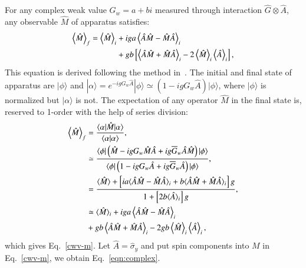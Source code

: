 \documentclass[twocolumn,pra,aps,superscriptaddress]{revtex4-2}
\begin{document}
For any complex weak value $G_{w}=a+bi$ measured through interaction $\hat{G}\otimes \hat{A}$, any observable $\hat{M}$ of apparatus satisfies:
\begin{align}
\label{cwv-m}
\left\langle \hat{M}\right\rangle _{f}=\left\langle \hat{M}\right\rangle _{i} &+iga\left\langle \hat{A}\hat{M}-\hat{M}\hat{A}\right\rangle _{i}\notag
\\&+gb\left[\left\langle \hat{A}\hat{M}+\hat{M}\hat{A}\right\rangle _{i}-2\left\langle \hat{M}\right\rangle _{i}\left\langle \hat{A}\right\rangle _{i}\right],
\end{align}
This equation is derived following the method in~\cite{jozsa}. The initial and final state of apparatus are $|\phi\rangle$ and $|\alpha\rangle = e^{-igG_w\hat{A}} |\phi\rangle \simeq \left(1-igG_w\hat{A} \right) |\phi\rangle$, where $|\phi\rangle$ is normalized but $|\alpha\rangle$ is not. The expectation of any operator $\hat{M}$ in the final state is, reserved to 1-order with the help of series division:
\begin{align}
\label{derive}
\left\langle \hat{M}\right\rangle _{f}
&=\frac{\langle\alpha|\hat{M}|\alpha\rangle}{\langle\alpha|
\alpha\rangle}, \notag\\
&\simeq\frac{\langle\phi|\left(\hat{M}-igG_w\hat{M}\hat{A} + ig\overline{G}_w\hat{A}\hat{M} \right) |\phi\rangle}{\langle\phi|\left(1-igG_w\hat{A} + ig\overline{G}_w\hat{A} \right) |\phi\rangle},\notag\\
&=\frac{\langle\hat{M}\rangle + \left[ia\langle\hat{A}\hat{M} - \hat{M}\hat{A} \rangle_i +b \langle\hat{A}\hat{M} + \hat{M}\hat{A} \rangle_i \right]g }{1+\left[2b\langle\hat{A}\rangle_i \right] g}, \notag\\
&\simeq \langle\hat{M}\rangle_i + iga\left\langle \hat{A}\hat{M}-\hat{M}\hat{A}\right\rangle _{i}\notag\\&+gb\left\langle \hat{A}\hat{M}+\hat{M}\hat{A}\right\rangle _{i}-2gb\left\langle \hat{M}\right\rangle _{i}\left\langle \hat{A}\right\rangle _{i} ,
\end{align}
which gives Eq.~\eqref{cwv-m}.
Let $\hat{A}=\hat{\sigma}_y$ and put spin components into $M$ in Eq.~\eqref{cwv-m}, we obtain Eq.~\eqref{eqn:complex}.
\end{document}
